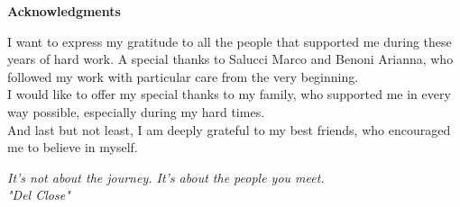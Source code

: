 \thispagestyle{empty}

\begin{center}
  {\bf \Huge Acknowledgments}
\end{center}

\vspace{4cm}

  I want to express my gratitude to all the people that supported me during these years of hard work. 
  A special thanks to Salucci Marco and Benoni Arianna, who followed my work with particular care from the very beginning.\\
 I would like to offer my special thanks to my family, who supported me in every way possible, especially during my hard times.\\
  And last but not least, I am deeply grateful to my best friends, who encouraged me to believe in myself.
  \bigskip
  

\begin{FlushRight}
\emph{It's not about the journey. It's about the people you meet.\\
"Del Close"}
\end{FlushRight}